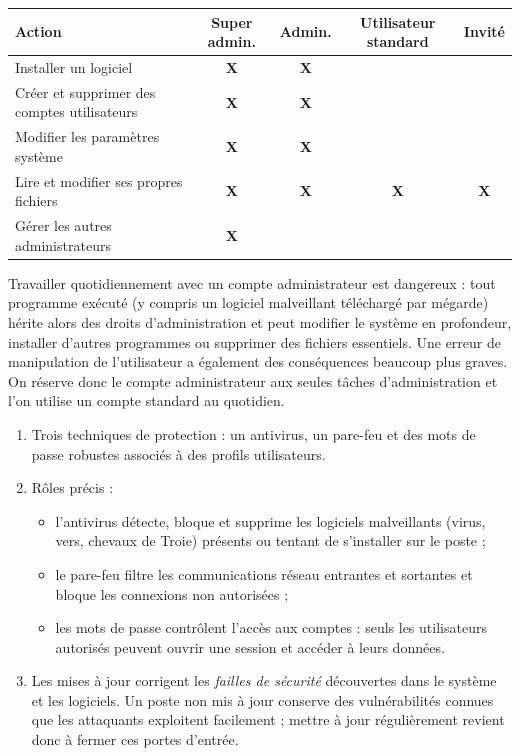 \documentclass[11pt]{article}
\newcommand{\cle}[1]{{\popxbold\color{popdark}#1}}
\begin{document}
\begin{corrige}
\begin{center}
\begin{tabularx}{\linewidth}{|X|c|c|c|c|}
\hline
\rowcolor{popblueL} \textbf{Action} & \textbf{Super admin.} & \textbf{Admin.} & \textbf{Utilisateur standard} & \textbf{Invité} \\
\hline
Installer un logiciel & \textbf{X} & \textbf{X} & & \\
\hline
Créer et supprimer des comptes utilisateurs & \textbf{X} & \textbf{X} & & \\
\hline
Modifier les paramètres système & \textbf{X} & \textbf{X} & & \\
\hline
Lire et modifier ses propres fichiers & \textbf{X} & \textbf{X} & \textbf{X} & \textbf{X} \\
\hline
Gérer les autres administrateurs & \textbf{X} & & & \\
\hline
\end{tabularx}
\end{center}
Travailler quotidiennement avec un compte administrateur est dangereux : tout programme exécuté (y compris un logiciel malveillant téléchargé par mégarde) hérite alors des droits d'administration et peut modifier le système en profondeur, installer d'autres programmes ou supprimer des fichiers essentiels. Une erreur de manipulation de l'utilisateur a également des conséquences beaucoup plus graves. On réserve donc le compte administrateur aux seules tâches d'administration et l'on utilise un compte standard au quotidien.
\end{corrige}

\begin{corrige}
\begin{enumerate}
\item Trois techniques de protection : un \cle{antivirus}, un \cle{pare-feu} et des \cle{mots de passe} robustes associés à des profils utilisateurs.
\item Rôles précis :
\begin{itemize}
\item l'antivirus détecte, bloque et supprime les logiciels malveillants (virus, vers, chevaux de Troie) présents ou tentant de s'installer sur le poste ;
\item le pare-feu filtre les communications réseau entrantes et sortantes et bloque les connexions non autorisées ;
\item les mots de passe contrôlent l'accès aux comptes : seuls les utilisateurs autorisés peuvent ouvrir une session et accéder à leurs données.
\end{itemize}
\item Les mises à jour corrigent les \emph{failles de sécurité} découvertes dans le système et les logiciels. Un poste non mis à jour conserve des vulnérabilités connues que les attaquants exploitent facilement ; mettre à jour régulièrement revient donc à fermer ces portes d'entrée.
\end{enumerate}
\end{corrige}
\end{document}
